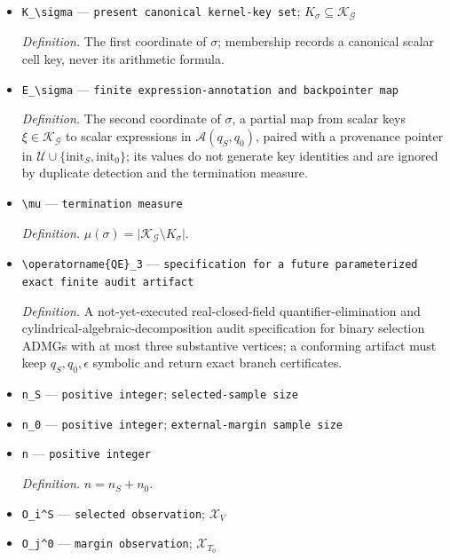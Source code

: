 \documentclass{article}
\begin{document}
\begin{itemize}
  \item \texttt{K\_\allowbreak{}\textbackslash{}\allowbreak{}sigma} --- \texttt{present canonical kernel-\allowbreak{}key set}; \(K_\sigma\subseteq\mathscr K_{\mathcal G}\)
  \par\smallskip\noindent\emph{Definition.} The first coordinate of \(\sigma\); membership records a canonical scalar cell key, never its arithmetic formula.
  \item \texttt{E\_\allowbreak{}\textbackslash{}\allowbreak{}sigma} --- \texttt{finite expression-\allowbreak{}annotation and backpointer map}
  \par\smallskip\noindent\emph{Definition.} The second coordinate of \(\sigma\), a partial map from scalar keys \(\xi\in\mathscr K_{\mathcal G}\) to scalar expressions in \(\mathcal A(q_S,q_0)\), paired with a provenance pointer in \(\mathscr U\cup\{\mathrm{init}_S,\mathrm{init}_0\}\); its values do not generate key identities and are ignored by duplicate detection and the termination measure.
  \item \texttt{\textbackslash{}\allowbreak{}mu} --- \texttt{termination measure}
  \par\smallskip\noindent\emph{Definition.} \(\mu(\sigma)=\lvert\mathscr K_{\mathcal G}\setminus K_\sigma\rvert\).
  \item \texttt{\textbackslash{}\allowbreak{}operatorname\{QE\}\allowbreak{}\_\allowbreak{}3} --- \texttt{specification for a future parameterized exact finite audit artifact}
  \par\smallskip\noindent\emph{Definition.} A not-yet-executed real-closed-field quantifier-elimination and cylindrical-algebraic-decomposition audit specification for binary selection ADMGs with at most three substantive vertices; a conforming artifact must keep \(q_S,q_0,\epsilon\) symbolic and return exact branch certificates.
  \item \texttt{n\_\allowbreak{}S} --- \texttt{positive integer}; \texttt{selected-\allowbreak{}sample size}
  \item \texttt{n\_\allowbreak{}0} --- \texttt{positive integer}; \texttt{external-\allowbreak{}margin sample size}
  \item \texttt{n} --- \texttt{positive integer}
  \par\smallskip\noindent\emph{Definition.} \(n=n_S+n_0\).
  \item \texttt{O\_\allowbreak{}i\textasciicircum{}S} --- \texttt{selected observation}; \(\mathcal X_V\)
  \item \texttt{O\_\allowbreak{}j\textasciicircum{}0} --- \texttt{margin observation}; \(\mathcal X_{T_0}\)

\end{itemize}
\end{document}
